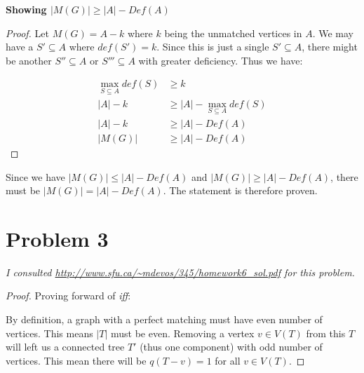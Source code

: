\documentclass[11pt]{article}
\begin{document}
\textbf{Showing $|M(G)| \geq |A| - Def(A)$}
\begin{proof}
Let $M(G) = A - k$ where $k$ being the unmatched vertices in $A$. We may have a $S' \subseteq A$ where $def(S') = k$. Since this is just a single $S' \subseteq A$, there might be another $S'' \subseteq A$ or $S''' \subseteq A$ with greater deficiency. Thus we have:

\begin{align*}
    \max_{S \subseteq A} def(S) &\geq k \\
    |A| - k &\geq |A| - \max_{S \subseteq A} def(S) \\
    |A| - k &\geq |A| - Def(A) \\
    |M(G)|  &\geq |A| - Def(A)
\end{align*}

\end{proof}

Since we have $|M(G)| \leq |A| - Def(A)$ and $|M(G)| \geq |A| - Def(A)$, there must be $|M(G)| = |A| - Def(A)$. The statement is therefore proven.


\section{Problem 3}

\textit{I consulted \url{http://www.sfu.ca/~mdevos/345/homework6_sol.pdf} for this problem.\newline}

\begin{proof}
Proving forward of \textit{iff}:

By definition, a graph with a perfect matching must have even number of vertices. This means $|T|$ must be even. Removing a vertex $v \in V(T)$ from this $T$ will left us a connected tree $T'$ (thus one component) with odd number of vertices. This mean there will be $q(T-v) = 1$ for all $v \in V(T)$.
\end{proof}
\end{document}
